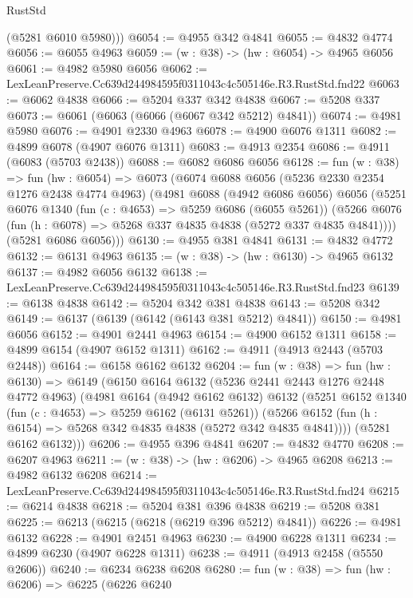 \begin{lexlean}{RustStd}
\begin{coremodule}
        (@5281 @6010 @5980)))
@6054 := @4955 @342 @4841
@6055 := @4832 @4774
@6056 := @6055 @4963
@6059 := (w : @38) -> (hw : @6054) -> @4965 @6056
@6061 := @4982 @5980 @6056
@6062 := LexLeanPreserve.Cc639d244984595f0311043c4c505146e.R3.RustStd.fnd22
@6063 := @6062 @4838
@6066 := @5204 @337 @342 @4838
@6067 := @5208 @337
@6073 := @6061 (@6063 (@6066 (@6067 @342 @5212) @4841))
@6074 := @4981 @5980
@6076 := @4901 @2330 @4963
@6078 := @4900 @6076 @1311
@6082 := @4899 @6078 (@4907 @6076 @1311)
@6083 := @4913 @2354
@6086 := @4911 (@6083 (@5703 @2438))
@6088 := @6082 @6086 @6056
@6128 := fun (w : @38) =>
  fun (hw : @6054) =>
  @6073
    (@6074
      @6088
      @6056
      (@5236 @2330 @2354 @1276 @2438 @4774 @4963)
      (@4981
        @6088
        (@4942 @6086 @6056)
        @6056
        (@5251
          @6076
          @1340
          (fun (c : @4653) => @5259 @6086 (@6055 @5261))
          (@5266 @6076 (fun (h : @6078) => @5268 @337 @4835 @4838 (@5272 @337 @4835 @4841))))
        (@5281 @6086 @6056)))
@6130 := @4955 @381 @4841
@6131 := @4832 @4772
@6132 := @6131 @4963
@6135 := (w : @38) -> (hw : @6130) -> @4965 @6132
@6137 := @4982 @6056 @6132
@6138 := LexLeanPreserve.Cc639d244984595f0311043c4c505146e.R3.RustStd.fnd23
@6139 := @6138 @4838
@6142 := @5204 @342 @381 @4838
@6143 := @5208 @342
@6149 := @6137 (@6139 (@6142 (@6143 @381 @5212) @4841))
@6150 := @4981 @6056
@6152 := @4901 @2441 @4963
@6154 := @4900 @6152 @1311
@6158 := @4899 @6154 (@4907 @6152 @1311)
@6162 := @4911 (@4913 @2443 (@5703 @2448))
@6164 := @6158 @6162 @6132
@6204 := fun (w : @38) =>
  fun (hw : @6130) =>
  @6149
    (@6150
      @6164
      @6132
      (@5236 @2441 @2443 @1276 @2448 @4772 @4963)
      (@4981
        @6164
        (@4942 @6162 @6132)
        @6132
        (@5251
          @6152
          @1340
          (fun (c : @4653) => @5259 @6162 (@6131 @5261))
          (@5266 @6152 (fun (h : @6154) => @5268 @342 @4835 @4838 (@5272 @342 @4835 @4841))))
        (@5281 @6162 @6132)))
@6206 := @4955 @396 @4841
@6207 := @4832 @4770
@6208 := @6207 @4963
@6211 := (w : @38) -> (hw : @6206) -> @4965 @6208
@6213 := @4982 @6132 @6208
@6214 := LexLeanPreserve.Cc639d244984595f0311043c4c505146e.R3.RustStd.fnd24
@6215 := @6214 @4838
@6218 := @5204 @381 @396 @4838
@6219 := @5208 @381
@6225 := @6213 (@6215 (@6218 (@6219 @396 @5212) @4841))
@6226 := @4981 @6132
@6228 := @4901 @2451 @4963
@6230 := @4900 @6228 @1311
@6234 := @4899 @6230 (@4907 @6228 @1311)
@6238 := @4911 (@4913 @2458 (@5550 @2606))
@6240 := @6234 @6238 @6208
@6280 := fun (w : @38) =>
  fun (hw : @6206) =>
  @6225
    (@6226
      @6240

\end{coremodule}
\end{lexlean}
